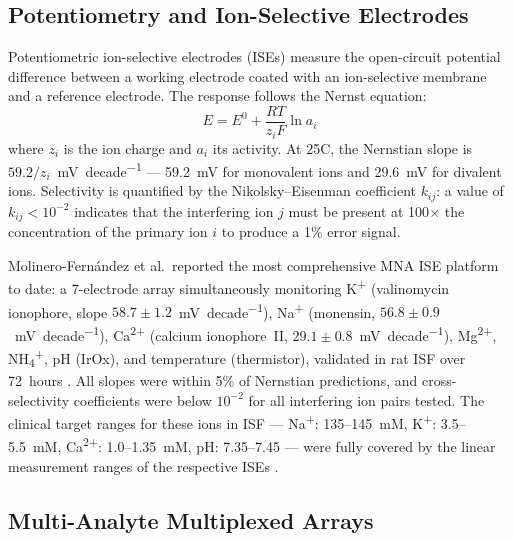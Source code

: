 \documentclass[review,1p]{elsarticle}
\begin{document}
\subsection{Potentiometry and Ion-Selective Electrodes}
\label{subsec:potentiometry}

Potentiometric ion-selective electrodes (ISEs) measure the open-circuit potential difference between a working electrode coated with an ion-selective membrane and a reference electrode. The response follows the Nernst equation:
\begin{equation}
E = E^0 + \frac{RT}{z_i F}\ln a_i
\label{eq:nernst}
\end{equation}
where $z_i$ is the ion charge and $a_i$ its activity. At 25\textdegree{}C, the Nernstian slope is $59.2/z_i$~mV~decade\textsuperscript{$-1$} — 59.2~mV for monovalent ions and 29.6~mV for divalent ions. Selectivity is quantified by the Nikolsky--Eisenman coefficient $k_{ij}$: a value of $k_{ij} < 10^{-2}$ indicates that the interfering ion $j$ must be present at 100$\times$ the concentration of the primary ion $i$ to produce a 1\% error signal.

Molinero-Fern\'{a}ndez et al.\ reported the most comprehensive MNA ISE platform to date: a 7-electrode array simultaneously monitoring K\textsuperscript{+} (valinomycin ionophore, slope $58.7 \pm 1.2$~mV~decade\textsuperscript{$-1$}), Na\textsuperscript{+} (monensin, $56.8 \pm 0.9$~mV~decade\textsuperscript{$-1$}), Ca\textsuperscript{2+} (calcium ionophore~II, $29.1 \pm 0.8$~mV~decade\textsuperscript{$-1$}), Mg\textsuperscript{2+}, NH\textsubscript{4}\textsuperscript{+}, pH (IrOx), and temperature (thermistor), validated in rat ISF over 72~hours \cite{MolineroFernandez2023}. All slopes were within 5\% of Nernstian predictions, and cross-selectivity coefficients were below $10^{-2}$ for all interfering ion pairs tested. The clinical target ranges for these ions in ISF — Na\textsuperscript{+}: 135--145~mM, K\textsuperscript{+}: 3.5--5.5~mM, Ca\textsuperscript{2+}: 1.0--1.35~mM, pH: 7.35--7.45 — were fully covered by the linear measurement ranges of the respective ISEs \cite{MolineroFernandez2023}.

\subsection{Multi-Analyte Multiplexed Arrays}
\label{subsec:multiplexed}
\end{document}
